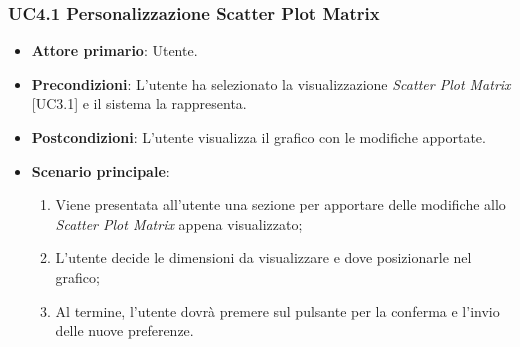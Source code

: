 \subsubsection{UC4.1 Personalizzazione Scatter Plot Matrix}
\begin{itemize}
	\item \textbf{Attore primario}: Utente.
	\item \textbf{Precondizioni}: L'utente ha selezionato la visualizzazione \textit{Scatter Plot Matrix} [UC3.1] e il sistema la rappresenta.
	\item \textbf{Postcondizioni}: L'utente visualizza il grafico con le modifiche apportate.
	\item \textbf{Scenario principale}:
	\begin{enumerate}
			\item Viene presentata all'utente una sezione per apportare delle modifiche allo \textit{Scatter Plot Matrix} appena visualizzato;
			\item L'utente decide le dimensioni da visualizzare e dove posizionarle nel grafico;
			\item Al termine, l'utente dovrà premere sul pulsante per la conferma e l'invio delle nuove preferenze.
		\end{enumerate}
\end{itemize}